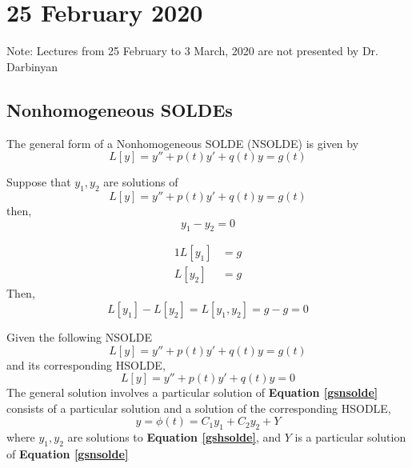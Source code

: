 \documentclass[diffeq.tex]{subfiles}
\begin{document}
\chapter{25 February 2020}
    Note: Lectures from 25 February to 3 March, 2020 are not presented by Dr. Darbinyan
    \section{Nonhomogeneous SOLDEs}
    \begin{definition}
        The general form of a Nonhomogeneous SOLDE (NSOLDE) is given by
        \begin{equation}
            L[y] = y'' + p(t)y' + q(t)y = g(t)
        \end{equation}
    \end{definition}
    \begin{btheorem}
        Suppose that $y_{1}, y_{2}$ are solutions of
        \begin{equation}
            L[y] = y'' + p(t)y' + q(t)y = g(t)
        \end{equation}
        then,
        \begin{equation}
            y_{1} - y_{2} = 0
        \end{equation}
    \end{btheorem}
    \begin{bproof}
        \begin{alignat}{1}
            L[y_{1}] & = g\\
            L[y_{2}] & = g
        \end{alignat}
        Then,
        \begin{equation}
            L[y_{1}] - L[y_{2}] = L[y_{1}, y_{2}] = g - g = 0
        \end{equation}
    \end{bproof}
    \begin{btheorem}
        Given the following NSOLDE
        \begin{equation}
            \label{gsnsolde}
            L[y] = y'' + p(t)y' + q(t)y = g(t)
        \end{equation}
        and its corresponding HSOLDE,
        \begin{equation}
            \label{gshsolde}
            L[y] = y'' + p(t)y' + q(t)y = 0
        \end{equation}
        The general solution involves a particular solution of \textbf{Equation \ref{gsnsolde}} consists of a particular solution and a solution of the corresponding HSODLE,
        \begin{equation}
            \label{gs}
            y = \phi(t) = C_{1}y_{1} + C_{2}y_{2} + Y
        \end{equation}
        where $y_{1}, y_{2}$ are solutions to \textbf{Equation \ref{gshsolde}}, and $Y$ is a particular solution of \textbf{Equation \ref{gsnsolde}}
    \end{btheorem}
\end{document}
